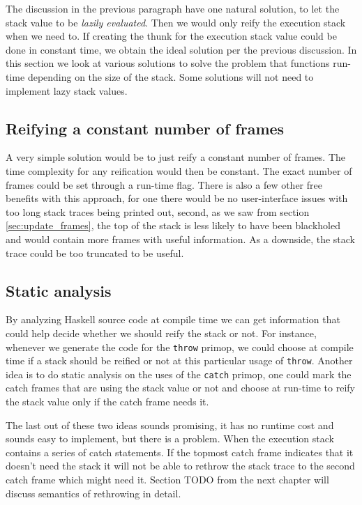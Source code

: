 The discussion in the previous paragraph have one natural solution, to
let the stack value to be \emph{lazily evaluated}. Then we would only
reify the execution stack when we need to. If creating the thunk for
the execution stack value could be done in constant time, we obtain the
ideal solution per the previous discussion. In this section we look at
various solutions to solve the problem that functions run-time depending
on the size of the stack. Some solutions will not need to implement
lazy stack values.

\subsection{Reifying a constant number of frames}

A very simple solution would be to just reify a constant number of
frames. The time complexity for any reification would then be constant.
The exact number of frames could be set through a run-time flag. There
is also a few other free benefits with this approach, for one there
would be no user-interface issues with too long stack traces being
printed out, second, as we saw from section \ref{sec:update_frames},
the top of the stack is less likely to have been blackholed and would
contain more frames with useful information. As a downside, the stack
trace could be too truncated to be useful.

\subsection{Static analysis}

By analyzing Haskell source code at compile time we can get
information that could help decide whether we should reify the stack or
not. For instance, whenever we generate the code for the \texttt{throw}
primop, we could choose at compile time if a stack should be reified or
not at this particular usage of \texttt{throw}. Another idea is to do
static analysis on the uses of the \texttt{catch} primop, one could mark
the catch frames that are using the stack value or not and choose at
run-time to reify the stack value only if the catch frame needs it.

The last out of these two ideas sounds promising, it has no runtime cost
and sounds easy to implement, but there is a problem. When the execution
stack contains a series of catch statements. If the topmost catch frame
indicates that it doesn't need the stack it will not be able to rethrow
the stack trace to the second catch frame which might need it. Section
TODO from the next chapter will discuss semantics of rethrowing in
detail.

